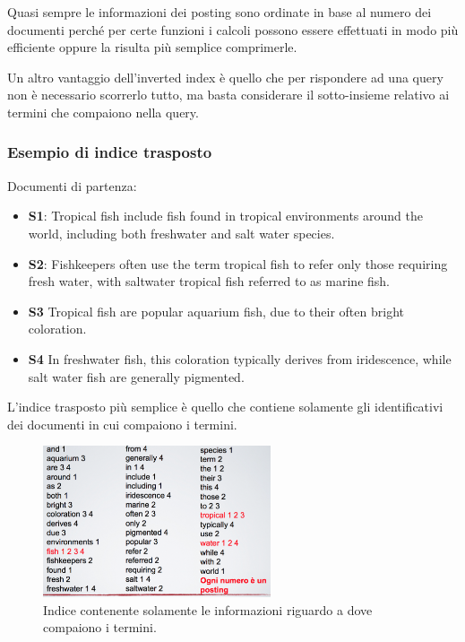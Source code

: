 Quasi sempre le informazioni dei posting sono ordinate in base al numero dei documenti perché per certe funzioni i calcoli possono essere effettuati in modo più efficiente oppure la risulta più semplice comprimerle.

Un altro vantaggio dell'inverted index è quello che per rispondere ad una query non è necessario scorrerlo tutto, ma basta considerare il sotto-insieme relativo ai termini che compaiono nella query.

\subsubsection{Esempio di indice trasposto}
Documenti di partenza:
\begin{itemize}
	\item \textbf{S1}: Tropical fish include fish found in tropical environments around the world, including both freshwater and salt water species.
	\item \textbf{S2}: Fishkeepers often use the term tropical fish to refer only those requiring fresh water, with saltwater tropical fish referred to as marine fish.
	\item \textbf{S3} Tropical fish are popular aquarium fish, due to their often bright coloration.
	\item \textbf{S4} In freshwater fish, this coloration typically derives from iridescence, while salt water fish are generally pigmented.
\end{itemize}

\noindent L'indice trasposto più semplice è quello che contiene solamente gli identificativi dei documenti in cui compaiono i termini.

\begin{figure}[htbp]
	\centering
	\includegraphics[width=0.6\textwidth]{./images/l6-index-1}
	\caption{Indice contenente solamente le informazioni riguardo a dove compaiono i termini.}
\end{figure}

